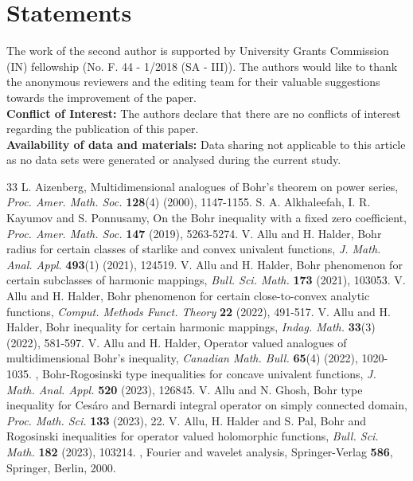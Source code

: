 \documentclass[11pt,reqno]{amsart}
\newtheorem{open problem}{Open problem}[section]
\numberwithin{equation}{section}
\begin{document}
\section{ Statements}
 The work of the second author is supported by University Grants Commission (IN) fellowship (No. F. 44 - 1/2018 (SA - III)). The authors would like to thank the anonymous reviewers and the editing team for their valuable suggestions towards the improvement of the paper.\\[2mm]
{\bf Conflict of Interest:} The authors declare that there are no conflicts of interest regarding the publication of this
paper.\\[2mm]
{\bf Availability of data and materials:} Data sharing not applicable to this article as no data sets were generated or analysed during
the current study.
\begin{thebibliography}{33}
 {\sc L. Aizenberg}, Multidimensional analogues of Bohr’s theorem on power series, {\it Proc. Amer. Math. Soc.} {\bf128}(4) (2000), 1147-1155.
 {\sc S. A. Alkhaleefah, I. R. Kayumov and S. Ponnusamy}, On the Bohr inequality with a fixed zero coefficient, {\it Proc. Amer. Math. Soc.} {\bf147} (2019), 5263-5274.
 {\sc V. Allu and H. Halder}, Bohr radius for certain classes of starlike and convex univalent functions, {\it J. Math. Anal. Appl.} {\bf493}(1) (2021), 124519.
 {\sc V. Allu and H. Halder}, Bohr phenomenon for certain subclasses of harmonic mappings, {\it Bull. Sci. Math.} {\bf173} (2021), 103053.
 {\sc V. Allu and H. Halder}, Bohr phenomenon for certain close-to-convex analytic functions, {\it Comput. Methods Funct. Theory} {\bf22} (2022), 491-517.
 {\sc V. Allu and H. Halder}, Bohr inequality for certain harmonic mappings, {\it Indag. Math.} {\bf33}(3) (2022), 581-597.
 {\sc V. Allu and H. Halder}, Operator valued analogues of multidimensional Bohr's inequality, {\it Canadian Math. Bull.} {\bf 65}(4) (2022), 1020-1035.
, Bohr-Rogosinski type inequalities for concave univalent functions, {\it J. Math. Anal. Appl.} {\bf520} (2023), 126845.
 {\sc V. Allu and N. Ghosh}, Bohr type inequality for Ces\'aro and Bernardi integral operator on simply connected domain, {\it Proc. Math. Sci.} {\bf 133} (2023), 22.
 {\sc V. Allu, H. Halder and S. Pal}, Bohr and Rogosinski inequalities for operator valued holomorphic functions, {\it Bull. Sci. Math.} {\bf182} (2023), 103214.
, Fourier and wavelet analysis, Springer-Verlag {\bf 586}, Springer, Berlin, 2000.

\end{thebibliography}
\end{document}
